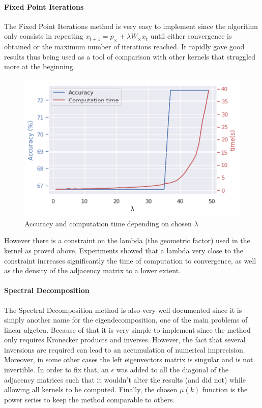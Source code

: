 \documentclass{article}
\theoremstyle{definition}
\begin{document}
\paragraph{Fixed Point Iterations}
The Fixed Point Iterations method is very easy to implement since the algorithm only consists in repeating $x_{t+1}=p_{\times}+\lambda W_{\times}x_t$ until either convergence is obtained or the maximum number of iterations reached. It rapidly gave good results thus being used as a tool of comparison with other kernels that struggled more at the beginning.
\begin{figure}[!htb]
	\centering
	\includegraphics[width=0.7\linewidth]{data/fixed_point/acc_comp_time_fct_lambda.png}
	\caption{Accuracy and computation time depending on chosen $\lambda$}
\end{figure}
However there is a constraint on the lambda (the geometric factor) used in the kernel as proved above. Experiments showed that a lambda very close to the constraint increases significantly the time of computation to convergence, as well as the density of the adjacency matrix to a lower extent.

\paragraph{Spectral Decomposition}
The Spectral Decomposition method is also very well documented since it is simply another name for the eigendecomposition, one of the main problems of linear algebra. Because of that it is very simple to implement since the method only requires Kronecker products and inverses. However, the fact that several inversions are required can lead to an accumulation of numerical imprecision. Moreover, in some other cases the left eigenvectors matrix is singular and is not invertible. In order to fix that, an $\epsilon$ was added to all the diagonal of the adjacency matrices such that it wouldn't alter the results (and did not) while allowing all kernels to be computed. Finally, the chosen $\mu(k)$ function is the power series to keep the method comparable to others.
\end{document}
